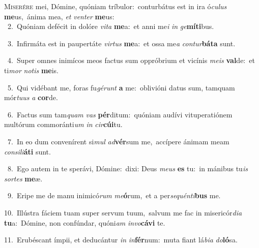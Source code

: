\lettrine{\initial\textcolor{\initialcolor}{M}}{iserére} mei, Dómine, quóniam tríbulor:~\dagger conturbátus est in ira ó\-\textit{cu}\-\textit{lus} \textbf{me}\-us,~\star ánima mea, \textit{et} \textit{ven}\-\textit{ter} \textbf{me}\-us:\\
{\numbfont\textcolor{\numbcolor}{~2.}}~Quóniam defécit in dolóre \textit{vi}\-\textit{ta} \textbf{me}\-a:~\star et anni me\textit{i} \textit{in} \textit{ge}\-\textbf{mí}\textbf{ti}bus.\par
{\numbfont\textcolor{\numbcolor}{~3.}}~Infirmáta est in paupertáte \textit{vir}\-\textit{tus} \textbf{me}\-a:~\star et ossa me\textit{a} \textit{con}\-\textit{tur}\textbf{bá}\textbf{ta} sunt.\par
{\numbfont\textcolor{\numbcolor}{~4.}}~Super omnes inimícos meos factus sum oppróbrium et vicínis \textit{me}\-\textit{is} \textbf{val}\-de:~\star et ti\textit{mor} \textit{no}\-\textit{tis} \textbf{me}\-is.\par
{\numbfont\textcolor{\numbcolor}{~5.}}~Qui vidébant me, foras fu\-\textit{gé}\-\textit{runt} \textbf{a} me:~\star oblivióni datus sum, tamquam mór\-\textit{tu}\-\textit{us} \textit{a} \textbf{cor}\-de.\par
{\numbfont\textcolor{\numbcolor}{~6.}}~Factus sum tam\textit{quam} \textit{vas} \textbf{pér}\-ditum:~\star quóniam audívi vituperatiónem multórum commoránti\textit{um} \textit{in} \textit{cir}\-\textbf{cú}\textbf{i}tu.\par
{\numbfont\textcolor{\numbcolor}{~7.}}~In eo dum convenírent si\textit{mul} \textit{ad}\-\textbf{vér}sum me,~\star accípere ánimam meam \textit{con}\-\textit{si}\textit{li}\textbf{á}\textbf{ti} sunt.\par
{\numbfont\textcolor{\numbcolor}{~8.}}~Ego autem in te sperávi, Dómine:~\dagger dixi: Deus \textit{me}\-\textit{us} \textbf{es} tu:~\star in mánibus tu\textit{is} \textit{sor}\-\textit{tes} \textbf{me}\-æ.\par
{\numbfont\textcolor{\numbcolor}{~9.}}~Eripe me de manu inimicó\textit{rum} \textit{me}\-\textbf{ó}rum,~\star et a per\-\textit{se}\-\textit{quén}\textit{ti}\textbf{bus} me.\par
{\numbfont\textcolor{\numbcolor}{10.}}~Illústra fáciem tuam super servum tuum,~\dagger salvum me fac in misericór\-\textit{di}\-\textit{a} \textbf{tu}\-a:~\star Dómine, non confúndar, quóni\textit{am} \textit{in}\-\textit{vo}\textbf{cá}\textbf{vi} te.\par
{\numbfont\textcolor{\numbcolor}{11.}}~Erubéscant ímpii, et deducántur \textit{in} \textit{in}\-\textbf{fér}num:~\star muta fiant lá\-\textit{bi}\-\textit{a} \textit{do}\-\textbf{ló}sa.\par
